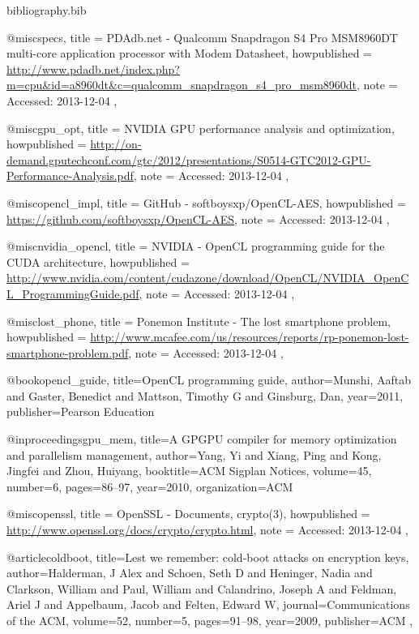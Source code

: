 \documentclass[conference,10pt]{IEEEtran}
\begin{document}
\begin{filecontents*}{bibliography.bib}

    @misc{specs,
        title = {{PDAdb.net -  Qualcomm Snapdragon S4 Pro MSM8960DT multi-core application processor with 
        Modem Datasheet}},
        howpublished = 
        {\url{http://www.pdadb.net/index.php?m=cpu&id=a8960dt&c=qualcomm_snapdragon_s4_pro_msm8960dt}},
        note = {Accessed: 2013-12-04}
    },

    @misc{gpu_opt,
        title = {{NVIDIA GPU performance analysis and optimization}},
        howpublished = 
        {\url{http://on-demand.gputechconf.com/gtc/2012/presentations/S0514-GTC2012-GPU-Performance-Analysis.pdf}},
        note = {Accessed: 2013-12-04}
    },

    @misc{opencl_impl,
        title = {{GitHub -  softboysxp/OpenCL-AES}},
        howpublished = {\url{https://github.com/softboysxp/OpenCL-AES}},
        note = {Accessed: 2013-12-04}
    },

    @misc{nvidia_opencl,
        title = {{NVIDIA -  OpenCL programming guide for the CUDA architecture}},
        howpublished = 
        {\url{http://www.nvidia.com/content/cudazone/download/OpenCL/NVIDIA_OpenCL_ProgrammingGuide.pdf}},
        note = {Accessed: 2013-12-04}
    },

    @misc{lost_phone,
        title = {{Ponemon Institute -  The lost smartphone problem}},
        howpublished = 
        {\url{http://www.mcafee.com/us/resources/reports/rp-ponemon-lost-smartphone-problem.pdf}},
        note = {Accessed: 2013-12-04}
    },

    @book{opencl_guide,
        title={OpenCL programming guide},
        author={Munshi, Aaftab and Gaster, Benedict and Mattson, Timothy G and Ginsburg, Dan},
        year={2011},
        publisher={Pearson Education}
    }

    @inproceedings{gpu_mem,
        title={{A GPGPU compiler for memory optimization and parallelism management}},
        author={Yang, Yi and Xiang, Ping and Kong, Jingfei and Zhou, Huiyang},
        booktitle={ACM Sigplan Notices},
        volume={45},
        number={6},
        pages={86--97},
        year={2010},
        organization={ACM}
    }

    @misc{openssl,
        title = {{OpenSSL} - Documents, crypto(3)},
        howpublished = {\url{http://www.openssl.org/docs/crypto/crypto.html}},
        note = {Accessed: 2013-12-04}
    },

    @article{coldboot,
        title={Lest we remember: cold-boot attacks on encryption keys},
        author={Halderman, J Alex and Schoen, Seth D and Heninger, Nadia and Clarkson, William and Paul, 
        William and Calandrino, Joseph A and Feldman, Ariel J and Appelbaum, Jacob and Felten, Edward W},
        journal={Communications of the ACM},
        volume={52},
        number={5},
        pages={91--98},
        year={2009},
        publisher={ACM}
    },


\end{filecontents*}
\end{document}
